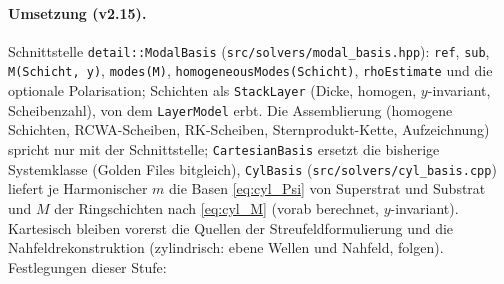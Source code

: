 \paragraph{Umsetzung (v2.15).} Schnittstelle \verb|detail::ModalBasis| (\verb|src/solvers/modal_basis.hpp|):
\verb|ref|, \verb|sub|, \verb|M(Schicht, y)|, \verb|modes(M)|, \verb|homogeneousModes(Schicht)|, \verb|rhoEstimate| und
die optionale Polarisation; Schichten als \verb|StackLayer| (Dicke, homogen, $y$-invariant, Scheibenzahl), von dem
\verb|LayerModel| erbt. Die Assemblierung (homogene Schichten, RCWA-Scheiben, RK-Scheiben, Sternprodukt-Kette,
Aufzeichnung) spricht nur mit der Schnittstelle; \verb|CartesianBasis| ersetzt die bisherige Systemklasse (Golden Files
bitgleich), \verb|CylBasis| (\verb|src/solvers/cyl_basis.cpp|) liefert je Harmonischer $m$ die Basen
\eqref{eq:cyl_Psi} von Superstrat und Substrat und $M$ der Ringschichten nach \eqref{eq:cyl_M} (vorab berechnet,
$y$-invariant). Kartesisch bleiben vorerst die Quellen der Streufeldformulierung und die Nahfeldrekonstruktion
(zylindrisch: ebene Wellen und Nahfeld, folgen). Festlegungen dieser Stufe:
